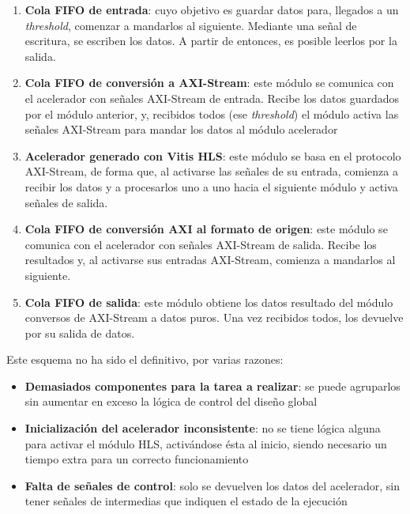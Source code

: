 \begin{enumerate}
    \item \textbf{Cola FIFO de entrada}: cuyo objetivo es guardar datos para, llegados a un \textit{threshold}, comenzar a mandarlos al siguiente. Mediante una señal de escritura, se escriben los datos. A partir de entonces, es posible leerlos por la salida.

    \item \textbf{Cola FIFO de conversión a AXI-Stream}: este módulo se comunica con el acelerador con señales AXI-Stream de entrada. Recibe los datos guardados por el módulo anterior, y, recibidos todos (ese \textit{threshold}) el módulo activa las señales AXI-Stream para mandar los datos al módulo acelerador

    \item \textbf{Acelerador generado con Vitis HLS}: este módulo se basa en el protocolo AXI-Stream, de forma que, al activarse las señales de su entrada, comienza a recibir los datos y a procesarlos uno a uno hacia el siguiente módulo y activa señales de salida.

    \item \textbf{Cola FIFO de conversión AXI al formato de origen}: este módulo se comunica con el acelerador con señales AXI-Stream de salida. Recibe los resultados y, al activarse sus entradas AXI-Stream, comienza a mandarlos al siguiente.

    \item \textbf{Cola FIFO de salida}: este módulo obtiene los datos resultado del módulo conversos de AXI-Stream a datos puros. Una vez recibidos todos, los devuelve por su salida de datos.
\end{enumerate}

Este esquema no ha sido el definitivo, por varias razones:

\begin{itemize}
    \item \textbf{Demasiados componentes para la tarea a realizar}: se puede agruparlos sin aumentar en exceso la lógica de control del diseño global
    \item \textbf{Inicialización del acelerador inconsistente}: no se tiene lógica alguna para activar el módulo HLS, activándose ésta al inicio, siendo necesario un tiempo extra para un correcto funcionamiento
    \item \textbf{Falta de señales de control}: solo se devuelven los datos del acelerador, sin tener señales de intermedias que indiquen el estado de la ejecución
\end{itemize}

